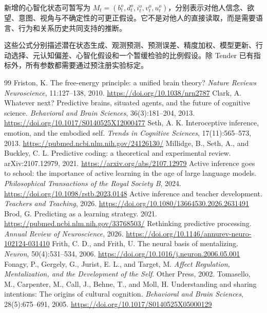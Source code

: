 \documentclass[UTF8,a4paper,11pt]{ctexart}
\begin{document}
新增的心智化状态可暂写为 $M_t=(b_t^o,d_t^o,i_t^o,v_t^o,u_t^o)$，分别表示对他人信念、欲望、意图、视角与不确定性的可更正假设。它不是对他人的直接读取，而是需要语言、行为和关系历史共同支持的推断。

这些公式分别描述潜在状态生成、观测预测、预测误差、精度加权、模型更新、行动选择、元认知偏差、心智化假设和一个暂缓检验的比例假设。除 Tender 已有指标外，所有参数都需要通过预注册实验标定。

\begin{thebibliography}{99}
 Friston, K. The free-energy principle: a unified brain theory? \emph{Nature Reviews Neuroscience}, 11:127--138, 2010. \url{https://doi.org/10.1038/nrn2787}
 Clark, A. Whatever next? Predictive brains, situated agents, and the future of cognitive science. \emph{Behavioral and Brain Sciences}, 36(3):181--204, 2013. \url{https://doi.org/10.1017/S0140525X12000477}
 Seth, A. K. Interoceptive inference, emotion, and the embodied self. \emph{Trends in Cognitive Sciences}, 17(11):565--573, 2013. \url{https://pubmed.ncbi.nlm.nih.gov/24126130/}
 Millidge, B., Seth, A., and Buckley, C. L. Predictive coding: a theoretical and experimental review. arXiv:2107.12979, 2021. \url{https://arxiv.org/abs/2107.12979}
 Active inference goes to school: the importance of active learning in the age of large language models. \emph{Philosophical Transactions of the Royal Society B}, 2024. \url{https://doi.org/10.1098/rstb.2023.0148}
 Active inference and teacher development. \emph{Teachers and Teaching}, 2026. \url{https://doi.org/10.1080/13664530.2026.2631491}
 Brod, G. Predicting as a learning strategy. 2021. \url{https://pubmed.ncbi.nlm.nih.gov/33768503/}
 Rethinking predictive processing. \emph{Annual Review of Neuroscience}, 2026. \url{https://doi.org/10.1146/annurev-neuro-102124-031410}
 Frith, C. D., and Frith, U. The neural basis of mentalizing. \emph{Neuron}, 50(4):531--534, 2006. \url{https://doi.org/10.1016/j.neuron.2006.05.001}
 Fonagy, P., Gergely, G., Jurist, E. L., and Target, M. \emph{Affect Regulation, Mentalization, and the Development of the Self}. Other Press, 2002.
 Tomasello, M., Carpenter, M., Call, J., Behne, T., and Moll, H. Understanding and sharing intentions: The origins of cultural cognition. \emph{Behavioral and Brain Sciences}, 28(5):675--691, 2005. \url{https://doi.org/10.1017/S0140525X05000129}
\end{thebibliography}
\end{document}
